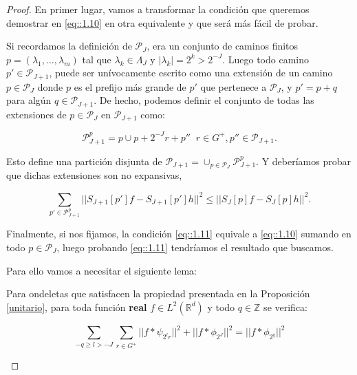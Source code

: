 \begin{proof}

\noindent En primer lugar, vamos a transformar la condición que queremos demostrar en \eqref{eq::1.10} en otra equivalente y que será más fácil de probar.

\medskip

\noindent Si recordamos la definición de $\mathcal{P}_J$, era un conjunto de caminos finitos $p=(\lambda_1,\ldots,\lambda_m)$ tal que $\lambda_k\in\Lambda_J$ y $|\lambda_k|=2^{k}>2^{-J}$. Luego todo camino $p' \in \mathcal{P}_{J+1}$, puede ser unívocamente escrito como una extensión de un camino $p\in \mathcal{P}_J$ donde $p$ es el prefijo más grande de $p'$ que pertenece a $\mathcal{P}_J$, y $p'=p+q$ para algún $q\in \mathcal{P}_{J+1}$. De hecho, podemos definir el conjunto de todas las extensiones de $p\in \mathcal{P}_J$ en $\mathcal{P}_{J+1}$ como: 

\begin{equation}
  \mathcal{P}_{J+1}^{p}={p} \cup {p+2^{-J}r+p''} \; \; r\in G^{+},p''\in \mathcal{P}_{J+1}.
\end{equation}

\noindent Esto define una partición disjunta de $\mathcal{P}_{J+1}=\cup_{p \in \mathcal{P}_J} \mathcal{P}_{J+1}^{p}$. Y deberíamos probar que dichas extensiones son no expansivas,

\begin{equation}\label{eq::1.11}
  \sum_{p' \in \mathcal{P}_{J+1}^p} || S_{J+1}[p']f-S_{J+1}[p']h||^2 \leq ||S_{J}[p]f-S_J [p]h||^2.
\end{equation}

\noindent Finalmente, si nos fijamos, la condición \eqref{eq::1.11} equivale a \eqref{eq::1.10} sumando en todo $p\in \mathcal{P}_J$, luego probando \eqref{eq::1.11} tendríamos el resultado que buscamos. 


\medskip


\noindent Para ello vamos a necesitar el siguiente lema:

\begin{lema}
  Para ondeletas que satisfacen la propiedad presentada en la Proposición \ref{unitario}, para toda función \textbf{real} $f\in L^2(\mathbb{R}^d)$ y todo $q \in \mathbb{Z}$ se verifica: 

  $$\sum_{-q\geq l > -J} \sum_{r \in G^+} || f \ast \psi_{2^lr}||^2 + || f \ast \phi_{2^J}||^2 = || f \ast \phi_{2^q} ||^2$$

\end{lema}


\end{proof}
